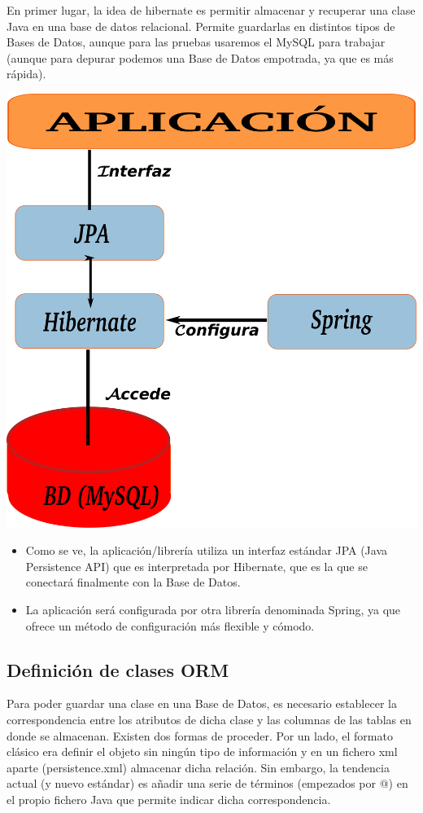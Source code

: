 \documentclass[11pt]{article}
\begin{document}
En primer lugar, la idea de hibernate es permitir almacenar y recuperar una clase Java en una base de
datos relacional. Permite guardarlas en distintos tipos de Bases de Datos, aunque para las pruebas
usaremos el MySQL para trabajar (aunque para depurar podemos una Base de Datos empotrada, ya que
es más rápida).


\begin{center}
\includegraphics[width=.6\textwidth]{esquemahibernate.pdf}
\end{center}




\begin{itemize}
\item Como se ve, la aplicación/librería utiliza un interfaz estándar JPA (Java Persistence API) que es
  interpretada por Hibernate, que es la que se conectará finalmente con la Base de Datos.
\item La aplicación será configurada por otra librería denominada Spring, ya que ofrece un método de
  configuración más flexible y cómodo.
\end{itemize}
\subsection{Definición de clases ORM}
\label{sec-6-2}




Para poder guardar una clase en una Base de Datos, es necesario establecer la correspondencia entre
los atributos de dicha clase y las columnas de las tablas en donde se almacenan. Existen dos formas
de proceder. Por un lado, el formato clásico era definir el objeto sin ningún tipo de información y
en un fichero xml aparte (persistence.xml) almacenar dicha relación. Sin embargo, la tendencia actual
(y nuevo estándar) es añadir una serie de términos (empezados por @) en el propio fichero Java que
permite indicar dicha correspondencia. 
\end{document}
